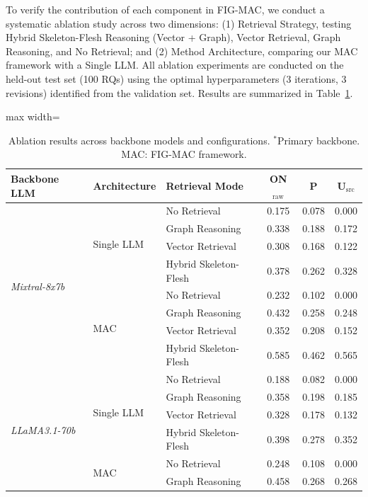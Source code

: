 \documentclass[runningheads]{llncs}
\begin{document}
To verify the contribution of each component in FIG-MAC, we conduct a systematic ablation study across two dimensions: (1) Retrieval Strategy, testing Hybrid Skeleton-Flesh Reasoning (Vector + Graph), Vector Retrieval, Graph Reasoning, and No Retrieval; and (2) Method Architecture, comparing our MAC framework with a Single LLM. All ablation experiments are conducted on the held-out test set (100 RQs) using the optimal hyperparameters (3 iterations, 3 revisions) identified from the validation set. Results are summarized in Table~\ref{tab:ablation_results}.

\begin{table}[t]
\centering
\small
\caption{Ablation results across backbone models and configurations. $^*$Primary backbone. MAC: FIG-MAC framework.}
\label{tab:ablation_results}
\begin{adjustbox}{max width=\textwidth}
\begin{tabular}{lllccc}
\toprule
\textbf{Backbone LLM} & \textbf{Architecture} & \textbf{Retrieval Mode} & \textbf{ON$_{\text{raw}}$} & \textbf{P} & \textbf{U$_{\text{src}}$} \\
\midrule
\multirow{8}{*}{\textit{Mixtral-8x7b}} 
 & \multirow{4}{*}{Single LLM} & No Retrieval & 0.175 & 0.078 & 0.000 \\
 &  & Graph Reasoning & 0.338 & 0.188 & 0.172 \\
 &  & Vector Retrieval & 0.308 & 0.168 & 0.122 \\
 &  & Hybrid Skeleton-Flesh & 0.378 & 0.262 & 0.328 \\
\cmidrule{2-6}
 & \multirow{4}{*}{MAC} & No Retrieval & 0.232 & 0.102 & 0.000 \\
 &  & Graph Reasoning & 0.432 & 0.258 & 0.248 \\
 &  & Vector Retrieval & 0.352 & 0.208 & 0.152 \\
 &  & Hybrid Skeleton-Flesh & 0.585 & 0.462 & 0.565 \\
\midrule
\multirow{8}{*}{\textit{LLaMA3.1-70b}} 
 & \multirow{4}{*}{Single LLM} & No Retrieval & 0.188 & 0.082 & 0.000 \\
 &  & Graph Reasoning & 0.358 & 0.198 & 0.185 \\
 &  & Vector Retrieval & 0.328 & 0.178 & 0.132 \\
 &  & Hybrid Skeleton-Flesh & 0.398 & 0.278 & 0.352 \\
\cmidrule{2-6}
 & \multirow{4}{*}{MAC} & No Retrieval & 0.248 & 0.108 & 0.000 \\
 &  & Graph Reasoning & 0.458 & 0.268 & 0.268 \\

\end{tabular}
\end{adjustbox}
\end{table}
\end{document}
